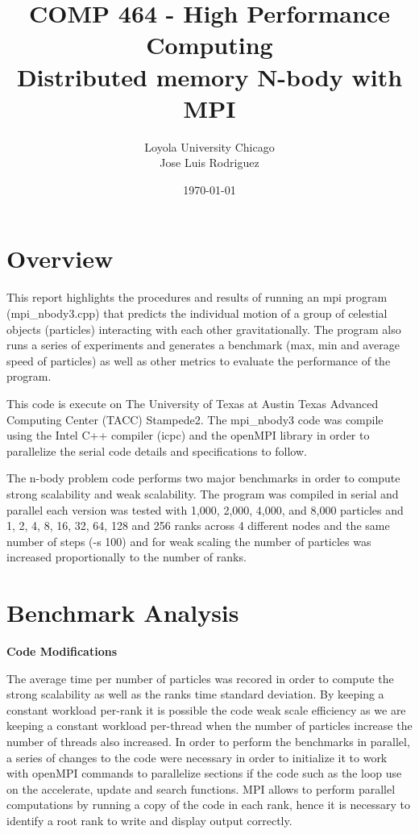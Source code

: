 \documentclass[12pt]{article} %
\title{ COMP 464 - High Performance Computing \\ Distributed memory N-body with MPI} %
\author{
Loyola University Chicago \\
Jose Luis Rodriguez 
} %
\date{\today} %
\begin{document}
\maketitle

\thispagestyle{fancy}


\section{Overview}

This report highlights the procedures and results of running an mpi program (mpi\_nbody3.cpp) that predicts the individual motion of a group of celestial objects (particles) interacting with each other gravitationally. The program also runs a series of experiments and generates a benchmark (max, min and average speed of particles) as well as other metrics to evaluate the performance of the program. 

This code is execute on The University of Texas at Austin Texas Advanced Computing Center (TACC) Stampede2. The mpi\_nbody3 code was compile using the Intel C++ compiler (icpc) and the openMPI library in order to parallelize the serial code details and specifications to follow.

The n-body problem code performs two major benchmarks in order to compute strong scalability and weak scalability. The program was compiled in serial and parallel each version was tested with 1,000, 2,000, 4,000, and 8,000 particles and 1, 2, 4, 8, 16, 32, 64, 128 and 256 ranks across 4 different nodes and the same number of steps (-s 100) and for weak scaling the number of particles was increased proportionally to the number of ranks. 

\section{Benchmark Analysis}

\textbf{Code Modifications} 

 The average time per number of particles was recored in order to compute the strong scalability as well as the ranks time standard deviation. By keeping a constant workload per-rank it is possible the code weak scale efficiency as we are keeping a constant workload per-thread when the number of particles increase the number of threads also increased. In order to perform the benchmarks in parallel, a series of changes to the code were necessary in order to initialize it to work with openMPI commands to parallelize sections if the code such as the loop use on the accelerate, update and search functions. MPI allows to perform parallel computations by running a copy of the code in each rank, hence it is necessary to identify a root rank to write and display output correctly. 
\end{document}
